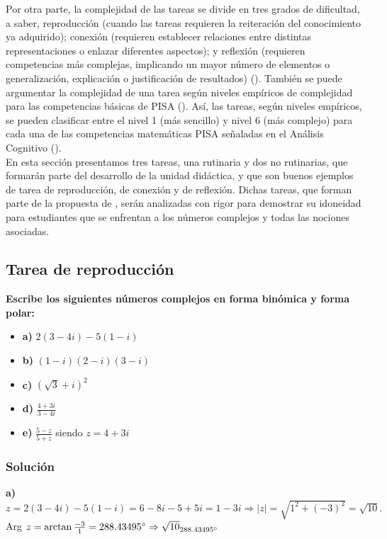 \documentclass[../main.tex]{memoir}
\begin{document}
Por otra parte, la complejidad de las tareas se divide en tres grados de dificultad, a saber, reproducción (cuando las tareas requieren la reiteración del conocimiento ya adquirido); conexión (requieren establecer relaciones entre distintas representaciones o enlazar diferentes aspectos); y reflexión (requieren competencias más complejas, implicando un mayor número de elementos o generalización, explicación o justificación de resultados) (\cite{rico2016}). También se puede argumentar la complejidad de una tarea según niveles empíricos de complejidad para las competencias básicas de PISA (\cite{pisaocde}). Así, las tareas, según niveles empíricos, se pueden clasificar entre el nivel 1 (más sencillo) y nivel 6 (más complejo) para cada una de las competencias matemáticas PISA señaladas en el Análisis Cognitivo (\cite{rico2016}). \\

En esta sección presentamos tres tareas, una rutinaria y dos no rutinarias, que formarán parte del desarrollo de la unidad didáctica, y que son buenos ejemplos de tarea de reproducción, de conexión y de reflexión. Dichas tareas, que forman parte de la propuesta de \cite{sm1bach}, serán analizadas con rigor para demostrar su idoneidad para estudiantes que se enfrentan a los números complejos y todas las nociones asociadas.

\subsection{Tarea de reproducción}

\textbf{Escribe los siguientes números complejos en forma binómica y forma polar:}

\begin{itemize}
	\item \textbf{a)} $2(3-4i)-5(1-i)$
	\item \textbf{b)} $(1-i)(2-i)(3-i)$
	\item \textbf{c)} $(\sqrt{3}+i)^2$
	\item \textbf{d)} $\frac{4+3i}{3-4i}$
	\item \textbf{e)} $\frac{5-z}{5+z}$ siendo $z=4+3i$
\end{itemize}

\subsubsection{Solución}

\textbf{a)} $z =2(3-4i)-5(1-i) = 6-8i-5+5i = 1-3i \Rightarrow |z| = \sqrt{1^2+(-3)^2} = \sqrt{10}.$ Arg $z = \arctan \frac{-3}{1} = 288.43495\degree \Rightarrow \sqrt{10}_{288.43495\degree}$ \\
\end{document}
